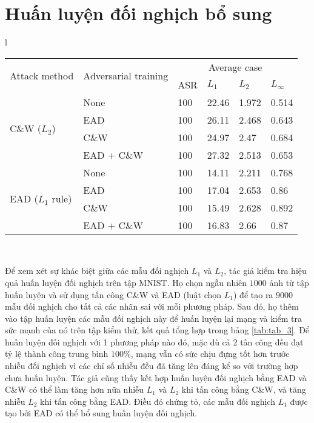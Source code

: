 \section{Huấn luyện đối nghịch bổ sung}
\begin{longtable}{l}
	\begin{tabular}{ll|llll}
		\hline
		\multirow{2}{*}{Attack method} & \multirow{2}{*}{Adversarial training} & \multicolumn{4}{c}{Average case} \\
		& & ASR & $L_1$ & $L_2$ & $L_\infty$ \\
		\hline
		\multirow{4}{*}{C\&W ($L_2$)} & None & 100 & 22.46 & 1.972 & 0.514 \\
		& EAD & 100 & 26.11 & 2.468 & 0.643 \\
		& C\&W & 100 & 24.97 & 2.47 & 0.684 \\
		& EAD + C\&W & 100 & 27.32 & 2.513 & 0.653 \\
		\hline
		\multirow{4}{*}{EAD ($L_1$ rule)} & None & 100 & 14.11 & 2.211 & 0.768 \\
		& EAD & 100 & 17.04 & 2.653 & 0.86 \\
		& C\&W & 100 & 15.49 & 2.628 & 0.892 \\
		& EAD + C\&W & 100 & 16.83 & 2.66 & 0.87 \\
		\hline
	\end{tabular} \\
	\caption[Huấn luyện đối nghịch sử dụng tấn công C\&W và EAD (luật $L_1$) trên tập dữ liệu MNIST]{Huấn luyện đối nghịch sử dụng tấn công C\&W và EAD (luật $L_1$) trên tập dữ liệu MNIST. ASR là tỷ lệ tấn công thành công. Kết hợp các mẫu $L_1$ bổ sung cho huấn luyện đối nghịch và tăng cường độ khó của tấn công về phương diện nhiễu. Kết quả đầy đủ có trong tài liệu mở rộng.}
	\label{tab:tab_3}
\end{longtable}	

Để xem xét sự khác biệt giữa các mẫu đối nghịch $L_1$ và $L_2$, tác giả kiểm tra hiệu quả huấn luyện đối nghịch trên tập MNIST. Họ chọn ngẫu nhiên $1000$ ảnh từ tập huấn luyện và sử dụng tấn công C\&W và EAD (luật chọn $L_1$) để tạo ra $9000$ mẫu đối nghịch cho tất cả các nhãn sai với mỗi phương pháp. Sau đó, họ thêm vào tập huấn luyện các mẫu đối nghịch này để huấn luyện lại mạng và kiểm tra sức mạnh của nó trên tập kiểm thử, kết quả tổng hợp trong bảng \ref{tab:tab_3}. Để huấn luyện đối nghịch với 1 phương pháp nào đó, mặc dù cả 2 tấn công đều đạt tỷ lệ thành công trung bình $100\%$, mạng vẫn có sức chịu đựng tốt hơn trước nhiễu đối nghịch vì các chỉ số nhiễu đều đã tăng lên đáng kể so với trường hợp chưa huấn luyện. Tác giả cũng thấy kết hợp huấn luyện đối nghịch bằng EAD và C\&W có thể làm tăng hơn nữa nhiễu $L_1$ và $L_2$ khi tấn công bằng C\&W, và tăng nhiễu $L_2$ khi tấn công bằng EAD. Điều đó chứng tỏ, các mẫu đối nghịch $L_1$ được tạo bởi EAD có thể bổ sung huấn luyện đối nghịch.  

